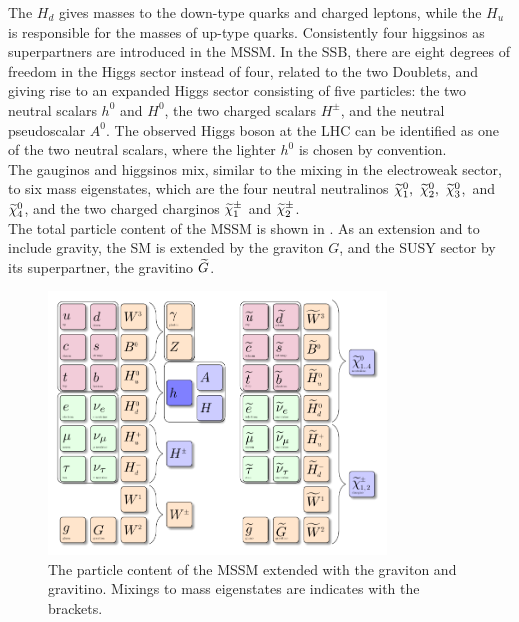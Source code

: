 The $H_d$ gives masses to the down-type quarks and charged leptons, while the $H_u$ is responsible for the masses of up-type quarks. Consistently four higgsinos as superpartners are introduced in the MSSM. In the SSB, there are eight degrees of freedom in the Higgs sector instead of four, related to the two Doublets, and giving rise to an expanded Higgs sector consisting of five particles: the two neutral scalars $h^0$ and $H^0$, the two charged scalars $H^{\pm}$, and the neutral pseudoscalar $A^0$. The observed Higgs boson at the LHC can be identified as one of the two neutral scalars, where the lighter $h^0$ is chosen by convention.\\
The gauginos and higgsinos mix, similar to the mixing in the electroweak sector, to six mass eigenstates, which are the four neutral neutralinos $\widetilde{\chi}^{0}_{1},~\widetilde{\chi}^{0}_{2},~\widetilde{\chi}^{0}_{3}$,~and $\widetilde{\chi}^{0}_{4}$, and the two charged charginos $\widetilde{\chi}^\pm_{1}$ and $\widetilde{\chi}^{\pm}_{2}$.\\
The total particle content of the MSSM is shown in . As an extension and to include gravity, the SM is extended by the graviton $G$, and the SUSY sector by its superpartner, the gravitino $\widetilde{G}$.

\begin{figure}[tbp]
 \centering
 \includegraphics[width=0.8\textwidth]{figures/general/MSSM}
 \caption{The particle content of the MSSM extended with the graviton and gravitino. Mixings to mass eigenstates are indicates with the brackets.}
 \label{fig:mssm}
\end{figure}

